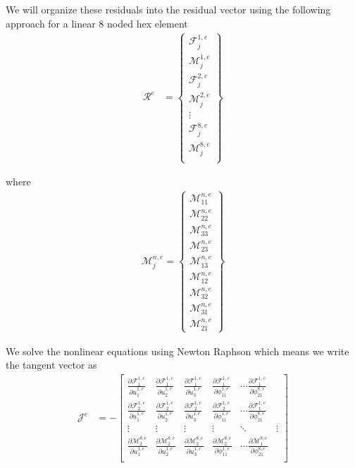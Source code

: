 We will organize these residuals into the residual vector using the following approach for a linear 8 noded hex element
\begin{align*}
\mathcal{R}^e &= \left\{\begin{array}{c}
\mathcal{F}_j^{1,e}\\
\mathcal{M}_j^{1,e}\\
\mathcal{F}_j^{2,e}\\
\mathcal{M}_j^{2,e}\\
\vdots\\
\mathcal{F}_j^{8,e}\\
\mathcal{M}_j^{8,e}\\
\end{array}\right\}
\end{align*}

where
\begin{align*}
\mathcal{M}_j^{n,e} = \left\{\begin{array}{c}
\mathcal{M}_{11}^{n,e}\\
\mathcal{M}_{22}^{n,e}\\
\mathcal{M}_{33}^{n,e}\\
\mathcal{M}_{23}^{n,e}\\
\mathcal{M}_{13}^{n,e}\\
\mathcal{M}_{12}^{n,e}\\
\mathcal{M}_{32}^{n,e}\\
\mathcal{M}_{31}^{n,e}\\
\mathcal{M}_{21}^{n,e}
\end{array}\right\}
\end{align*}

We solve the nonlinear equations using Newton Raphson which means we write the tangent vector as
\begin{align*}
\mathcal{J}^e &= -\left[\begin{array}{cccccc}
\frac{\partial \mathcal{F}_{1}^{1,e}}{\partial u_1^{1,e}} & \frac{\partial \mathcal{F}_{1}^{1,e}}{\partial u_2^{1,e}} & \frac{\partial \mathcal{F}_{1}^{1,e}}{\partial u_3^{1,e}} & \frac{\partial \mathcal{F}_{1}^{1,e}}{\partial \phi_{11}^{1,e}} & \cdots \frac{\partial \mathcal{F}_{1}^{1,e}}{\partial \phi_{21}^{8,e}}\\
\frac{\partial \mathcal{F}_{2}^{1,e}}{\partial u_1^{1,e}} & \frac{\partial \mathcal{F}_{2}^{1,e}}{\partial u_2^{1,e}} & \frac{\partial \mathcal{F}_{2}^{1,e}}{\partial u_3^{1,e}} & \frac{\partial \mathcal{F}_{2}^{1,e}}{\partial \phi_{11}^{1,e}} & \cdots \frac{\partial \mathcal{F}_{1}^{1,e}}{\partial \phi_{21}^{8,e}}\\
\vdots & \vdots & \vdots & \vdots & \ddots & \vdots\\
\frac{\partial \mathcal{M}_{2}^{8,e}}{\partial u_1^{1,e}} & \frac{\partial \mathcal{M}_{2}^{8,e}}{\partial u_2^{1,e}} & \frac{\partial \mathcal{M}_{2}^{8,e}}{\partial u_3^{1,e}} & \frac{\partial \mathcal{M}_{2}^{8,e}}{\partial \phi_{11}^{1,e}} & \cdots \frac{\partial \mathcal{M}_{1}^{8,e}}{\partial \phi_{21}^{8,e}}\\
\end{array}\right]
\end{align*}

